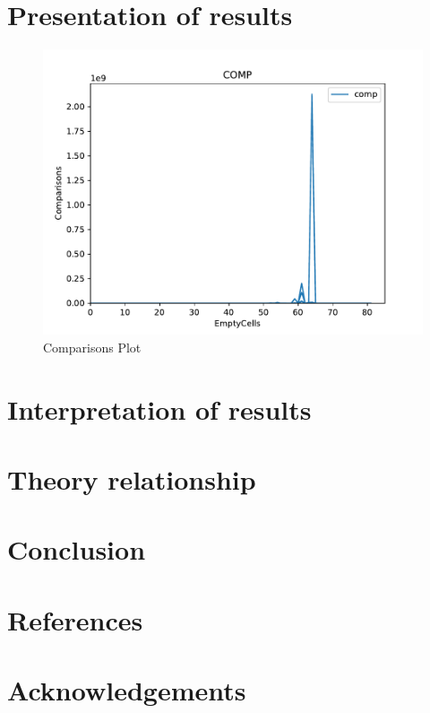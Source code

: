 \documentclass{article}
\begin{document}
    \section{Presentation of results}
    \begin{figure}[h]
        \centering
        \includegraphics[width=1\textwidth]{COMP.pdf}
        \caption{Comparisons Plot}
    \end{figure}
        

    \section{Interpretation of results}

    \section{Theory relationship}

    \section{Conclusion}

    \pagebreak
    \section{References}
    
    

    \section{Acknowledgements}
\end{document}
